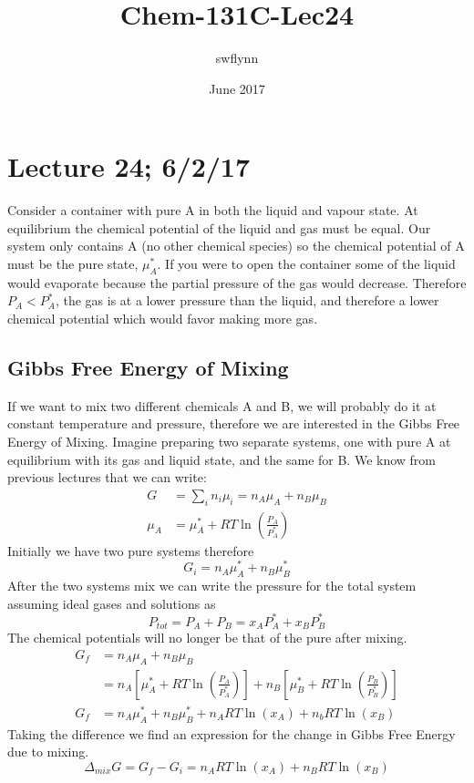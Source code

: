 \documentclass{article}
\title{Chem-131C-Lec24}
\author{swflynn}
\date{June 2017}
\begin{document}
\maketitle

\section*{Lecture 24; 6/2/17}
Consider a container with pure A in both the liquid and vapour state. 
At equilibrium the chemical potential of the liquid and gas must be equal.
Our system only contains A (no other chemical species) so the chemical potential of A must be the pure state, $\mu_A^*$. 
If you were to open the container some of the liquid would evaporate because the partial pressure of the gas would decrease. 
Therefore $P_A < P_A^*$, the gas is at a lower pressure than the liquid, and therefore a lower chemical potential which would favor making more gas. 

\subsection*{Gibbs Free Energy of Mixing}
If we want to mix two different chemicals A and B, we will probably do it at constant temperature and pressure, therefore we are interested in the Gibbs Free Energy of Mixing. 
Imagine preparing two separate systems, one with pure A at equilibrium with its gas and liquid state, and the same for B. 
We know from previous lectures that we can write:
\begin{equation}
\begin{split}
    G &= \sum_i n_i \mu_i = n_A \mu_A + n_B \mu_B \\
    \mu_A &= \mu_A^* + RT \ln\left(\frac{P_A}{P_A^*}\right)
    \end{split}
\end{equation}
Initially we have two pure systems therefore 
\begin{equation}
    G_i = n_A\mu_A^* + n_B\mu_B^*
\end{equation}
After the two systems mix  we can write the pressure for the total system assuming ideal gases and solutions as 
\begin{equation}
P_{tot} = P_A + P_B = x_AP_A^* + x_BP_B^*
\end{equation}
The chemical potentials will no longer be that of the pure after mixing. 
\begin{equation}
\begin{split}
    G_f &= n_A\mu_A + n_B\mu_B \\
    &= n_A\left[\mu_A^* + RT \ln\left(\frac{P_A}{P_A^*}\right)\right] + n_B \left[\mu_B^* + RT \ln\left(\frac{P_B}{P_B^*}\right)\right] \\
    G_f &= n_A\mu_A^* + n_B\mu_B^* + n_ART\ln(x_A) + n_bRT\ln(x_B)
    \end{split}
    \end{equation}
    Taking the difference we find an expression for the change in Gibbs Free Energy due to mixing. 
\begin{equation}
\Delta_{mix}G = G_f - G_i = n_ART\ln(x_A) + n_BRT\ln(x_B)
\end{equation}
\end{document}
